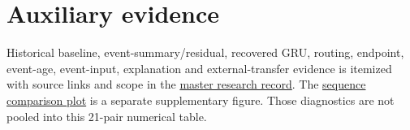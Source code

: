\documentclass[11pt,a4paper]{article}
\begin{document}
\section*{Auxiliary evidence}
Historical baseline, event-summary/residual, recovered GRU, routing, endpoint, event-age, event-input, explanation and external-transfer evidence is itemized with source links and scope in the \href{../docs/research_master_record_2026_11_08.md}{master research record}. The \href{figures/ap_differences.pdf}{sequence comparison plot} is a separate supplementary figure. Those diagnostics are not pooled into this 21-pair numerical table.
\end{document}
